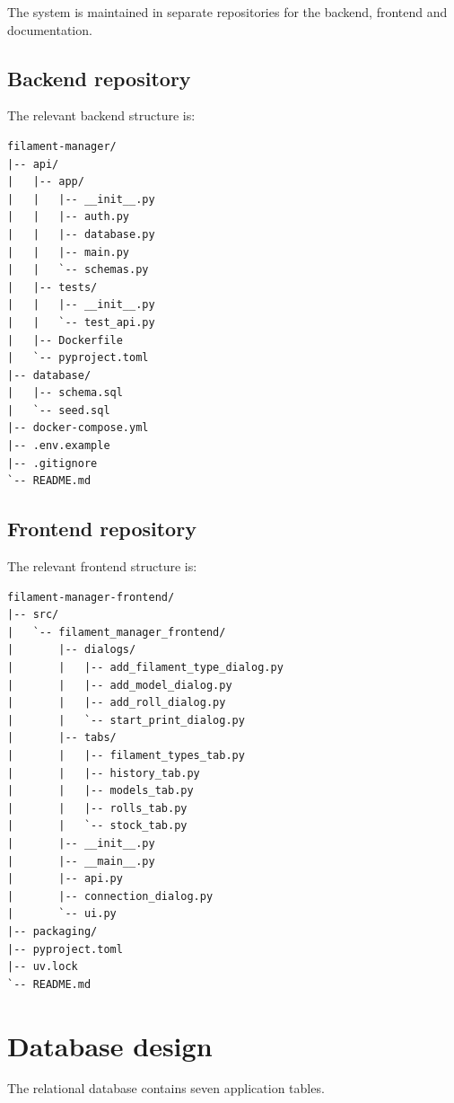 \documentclass[a4paper,11pt]{article}
\begin{document}
The system is maintained in separate repositories for the backend, frontend
and documentation.

\subsection{Backend repository}

The relevant backend structure is:

\begin{lstlisting}
filament-manager/
|-- api/
|   |-- app/
|   |   |-- __init__.py
|   |   |-- auth.py
|   |   |-- database.py
|   |   |-- main.py
|   |   `-- schemas.py
|   |-- tests/
|   |   |-- __init__.py
|   |   `-- test_api.py
|   |-- Dockerfile
|   `-- pyproject.toml
|-- database/
|   |-- schema.sql
|   `-- seed.sql
|-- docker-compose.yml
|-- .env.example
|-- .gitignore
`-- README.md
\end{lstlisting}

\subsection{Frontend repository}

The relevant frontend structure is:

\begin{lstlisting}
filament-manager-frontend/
|-- src/
|   `-- filament_manager_frontend/
|       |-- dialogs/
|       |   |-- add_filament_type_dialog.py
|       |   |-- add_model_dialog.py
|       |   |-- add_roll_dialog.py
|       |   `-- start_print_dialog.py
|       |-- tabs/
|       |   |-- filament_types_tab.py
|       |   |-- history_tab.py
|       |   |-- models_tab.py
|       |   |-- rolls_tab.py
|       |   `-- stock_tab.py
|       |-- __init__.py
|       |-- __main__.py
|       |-- api.py
|       |-- connection_dialog.py
|       `-- ui.py
|-- packaging/
|-- pyproject.toml
|-- uv.lock
`-- README.md
\end{lstlisting}

\section{Database design}

The relational database contains seven application tables.
\end{document}

